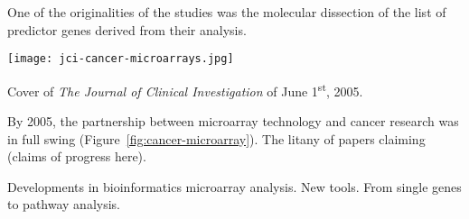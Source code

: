 One of the originalities of the  studies was the molecular
dissection of the list of predictor genes derived from their analysis.

\clearpage

\begin{marginfigure}%
  \texttt{[image: jci-cancer-microarrays.jpg]}
  \caption{Cover of \emph{The Journal of Clinical Investigation} of June
1\textsuperscript{st}, 2005.}
  \label{fig:cancer-microarray}
\end{marginfigure}

By 2005, the partnership between microarray technology and cancer research was
in full swing (Figure~\ref{fig:cancer-microarray}).  The litany of papers
claiming (claims of progress here).

Developments in bioinformatics microarray analysis.  New tools.  From single
genes to pathway analysis.







